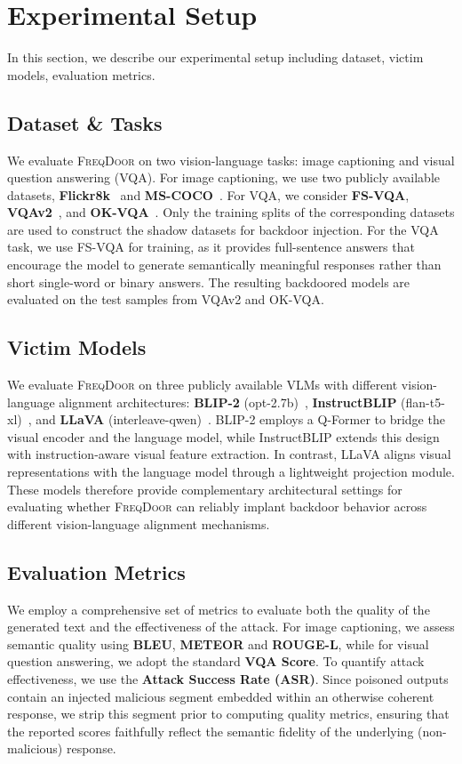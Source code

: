 \documentclass[lettersize,journal]{IEEEtran}
\begin{document}
\section{Experimental Setup}
In this section, we describe our experimental setup including dataset, victim models, evaluation metrics. 

\subsection{Dataset \& Tasks}
We evaluate \textsc{FreqDoor} on two vision-language tasks: image captioning and visual question answering (VQA). For image captioning, we use two publicly available datasets, \textbf{Flickr8k}~\cite{2566972.2566993} and \textbf{MS-COCO}~\cite{10.1007/978-3-319-10602-1_48}. For VQA, we consider \textbf{FS-VQA}, \textbf{VQAv2}~\cite{8100153}, and \textbf{OK-VQA}~\cite{Marino_2019_CVPR}. Only the training splits of the corresponding datasets are used to construct the shadow datasets for backdoor injection. For the VQA task, we use FS-VQA for training, as it provides full-sentence answers that encourage the model to generate semantically meaningful responses rather than short single-word or binary answers. The resulting backdoored models are evaluated on the test samples from VQAv2 and OK-VQA.

\subsection{Victim Models}
We evaluate \textsc{FreqDoor} on three publicly available VLMs with different vision-language alignment architectures: \textbf{BLIP-2} (opt-2.7b)~\cite{3618408.3619222}, \textbf{InstructBLIP} (flan-t5-xl)~\cite{Dai2023InstructBLIP}, and \textbf{LLaVA} (interleave-qwen)~\cite{Liu2023LLaVA}. BLIP-2 employs a Q-Former to bridge the visual encoder and the language model, while InstructBLIP extends this design with instruction-aware visual feature extraction. In contrast, LLaVA aligns visual representations with the language model through a lightweight projection module. These models therefore provide complementary architectural settings for evaluating whether \textsc{FreqDoor} can reliably implant backdoor behavior across different vision-language alignment mechanisms.

\subsection{Evaluation Metrics}
We employ a comprehensive set of metrics to evaluate both the quality of the generated text and the effectiveness of the attack. For image captioning, we assess semantic quality using \textbf{BLEU}, \textbf{METEOR} and \textbf{ROUGE-L}, while for visual question answering, we adopt the standard \textbf{VQA Score}. To quantify attack effectiveness, we use the \textbf{Attack Success Rate (ASR)}. Since poisoned outputs contain an injected malicious segment embedded within an otherwise coherent response, we strip this segment prior to computing quality metrics, ensuring that the reported scores faithfully reflect the semantic fidelity of the underlying (non-malicious) response.
\end{document}
